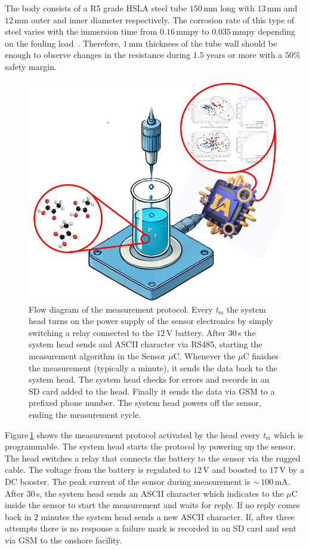 \documentclass[journal,twoside,web]{ieeecolor}
\begin{document}
The body consists of a R5 grade HSLA steel tube $150$\,mm long with $13$\,mm and $12$\,mm outer and inner diameter respectively. The corrosion rate of this type of steel varies with the immersion time from $0.16$\,mmpy to $0.035$\,mmpy depending on the fouling load~\cite{palanichamy2014,blekkenhorst1986}. Therefore, $1$\,mm thickness of the tube wall should be enough to observe changes in the resistance during $1.5$ years or more with a $50\%$ safety margin.

\begin{figure}[!t]
\centering
\includegraphics [trim = 35mm 0mm 20mm 10mm, clip, width=0.7\columnwidth]{figures/fig0.png}
\caption{Flow diagram of the measurement protocol. Every \textit{t$_{m}$} the system head turns on the power supply of the sensor electronics by simply switching a relay connected to the $12$\,V battery. After $30$\,s the system head sends and ASCII character via RS485, starting the measurement algorithm in the Sensor $\mu$C. Whenever the $\mu$C finishes the measurement (typically a minute), it sends the data back to the system head. The system head checks for errors and records in an SD card added to the head. Finally it sends the data via GSM to a prefixed phone number. The system head powers off the sensor, ending the measurement cycle.}
\label{fig:typCorrSensor}
\vspace{-0.5cm}
\end{figure}
Figure\,\ref{fig:typCorrSensor} shows the measurement protocol activated by the head every \textit{t$_{m}$} which is programmable. The system head starts the protocol by powering up the sensor. The head switches a relay that connects the battery to the sensor via the rugged cable. The voltage from the battery is regulated to $12$\,V and boosted to $17$\,V by a DC booster. The peak current of the sensor during measurement is $\sim$\,$100$\,mA. After $30$\,s, the system head sends an ASCII character which indicates to the $\mu$C inside the sensor to start the measurement and waits for reply. If no reply comes back in $2$ minutes the system head sends a new ASCII character. If, after three attempts there is no response a failure mark is recorded in an SD card and sent via GSM to the onshore facility.
\end{document}
